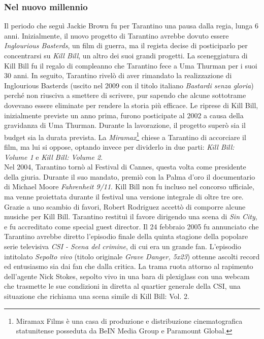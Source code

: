 \documentclass[12pt]{article} %
\begin{document}
\subsubsection{Nel nuovo millennio}
\begin{flushleft}
    Il periodo che seguì Jackie Brown fu per Tarantino una pausa dalla regia, lunga 6 anni. 
    Inizialmente, il nuovo progetto di Tarantino avrebbe dovuto essere \textit{Inglourious Basterds}, un film di guerra, 
    ma il regista decise di posticiparlo per concentrarsi su \textit{Kill Bill}, un altro dei suoi grandi progetti. 
    La sceneggiatura di Kill Bill fu il regalo di compleanno che Tarantino fece a Uma Thurman per i suoi 30 anni. 
    In seguito, Tarantino rivelò di aver rimandato la realizzazione di Inglourious Basterds (uscito nel 2009 con il titolo italiano \textit{Bastardi senza gloria}) 
    perché non riusciva a smettere di scrivere, pur sapendo che alcune sottotrame dovevano essere eliminate per rendere la storia più efficace.
    Le riprese di Kill Bill, inizialmente previste un anno prima, furono posticipate al 2002 a causa della gravidanza di Uma Thurman. 
    Durante la lavorazione, il progetto superò sia il budget sia la durata prevista. La \textit{Miramax}\footnote{Miramax Films è una casa di produzione e distribuzione cinematografica statunitense posseduta da BeIN Media Group e Paramount Global.} chiese a Tarantino di accorciare il film, 
    ma lui si oppose, optando invece per dividerlo in due parti: \textit{Kill Bill: Volume 1} e \textit{Kill Bill: Volume 2}. \\\vspace{1cm}
    Nel 2004, Tarantino tornò al Festival di Cannes, questa volta come presidente della giuria. Durante il suo mandato, premiò con la Palma d’oro il documentario di Michael Moore \textit{Fahrenheit 9/11}. Kill Bill non fu incluso nel concorso ufficiale, ma venne proiettata durante il festival una versione integrale di oltre tre ore.
    Grazie a uno scambio di favori, Robert Rodriguez accettò di comporre alcune musiche per Kill Bill. Tarantino restituì il favore dirigendo una scena di \textit{Sin City}, e fu accreditato come special guest director. 
    Il 24 febbraio 2005 fu annunciato che Tarantino avrebbe diretto l’episodio finale della quinta stagione della popolare serie televisiva \textit{CSI - Scena del crimine}, di cui era un grande fan. 
    L’episodio intitolato \textit{Sepolto vivo} (titolo originale \textit{Grave Danger, 5x23}) ottenne ascolti record ed entusiasmo sia dai fan che dalla critica.
    La trama ruota attorno al rapimento dell’agente Nick Stokes, sepolto vivo in una bara di plexiglass con una webcam che trasmette le sue condizioni in diretta al quartier generale della CSI, una situazione che richiama una scena simile di Kill Bill: Vol. 2.\\\vspace{1cm}

\end{flushleft}
\end{document}
